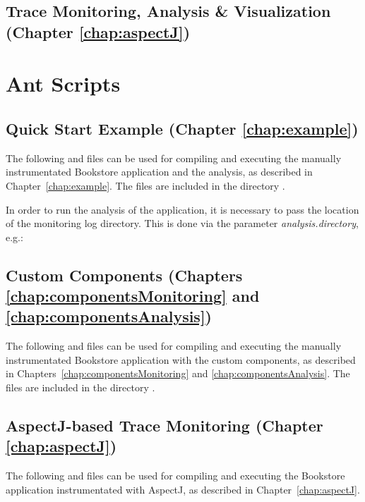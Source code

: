 \section{Trace Monitoring, Analysis \& Visualization (Chapter \ref{chap:aspectJ})}

	

\chapter{Ant Scripts}
\section{Quick Start Example (Chapter \ref{chap:example})}
The following  and  files can be %
used for compiling and executing the manually instrumentated Bookstore %
application and the analysis, as described in Chapter~\ref{chap:example}. %
The files are included in the directory \file{\manualInstrumentedBookstoreApplicationDirDistro{}/}.

      In order to run the analysis of the application, it is necessary to pass the location of the monitoring log directory. This is done via the parameter \textit{analysis.directory}, e.g.:
      \setBashListing
      

      \setXMLListing
      
      
\newpage
\section{Custom Components (Chapters \ref{chap:componentsMonitoring} and \ref{chap:componentsAnalysis})}
      The following  and  files can be used for compiling and executing the manually instrumentated Bookstore application with the custom components, as described in Chapters~\ref{chap:componentsMonitoring} and \ref{chap:componentsAnalysis}. %
The files are included in the directory \file{\customComponentsBookstoreApplicationDirDistro{}/}.
      \setXMLListing
      
      
\newpage
\section{AspectJ-based Trace Monitoring (Chapter \ref{chap:aspectJ})}
      The following  and  files can be used for compiling and executing the Bookstore application instrumentated with AspectJ, as described in Chapter~\ref{chap:aspectJ}. %

